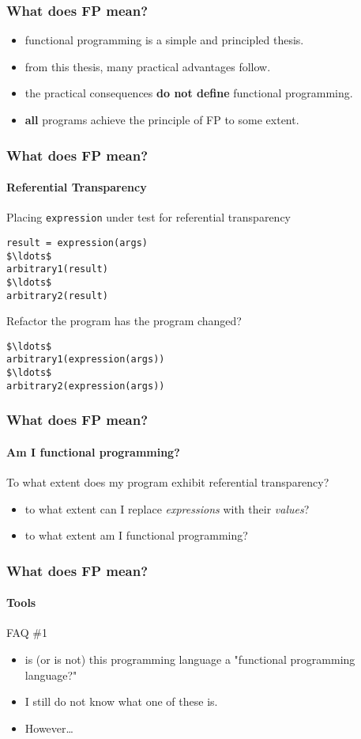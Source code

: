 \begin{frame}
\frametitle{What does FP mean?}
\begin{itemize}
  \item<1-> functional programming is a simple and principled thesis.
  \item<1-> from this thesis, many practical advantages follow.
  \item<2-> the practical consequences \textbf{do not define} functional programming.
  \item<3-> \textbf{all} programs achieve the principle of FP to some extent.
\end{itemize}
\end{frame}

\begin{frame}[fragile]
\frametitle{What does FP mean?}
\framesubtitle{Referential Transparency}
\begin{block}{Placing \lstinline{expression} under test for referential transparency}
\scriptsize
\begin{lstlisting}[mathescape]
result = expression(args)
$\ldots$
arbitrary1(result)
$\ldots$
arbitrary2(result)
\end{lstlisting}
\end{block}
\begin{block}{Refactor the program \textemdash has the program changed?}
\scriptsize
\begin{lstlisting}[mathescape]
$\ldots$
arbitrary1(expression(args))
$\ldots$
arbitrary2(expression(args))
\end{lstlisting}
\end{block}
\end{frame}

\begin{frame}[fragile]
\frametitle{What does FP mean?}
\framesubtitle{Am I functional programming?}
\begin{block}{To what extent does my program exhibit referential transparency?}
\begin{itemize}
  \item<1-> to what extent can I replace \emph{expressions} with their \emph{values}?
  \item<2-> to what extent am I functional programming?
\end{itemize}
\end{block}
\end{frame}

\begin{frame}[fragile]
\frametitle{What does FP mean?}
\framesubtitle{Tools}
\begin{block}{FAQ \#1}
\begin{itemize}
  \item<1-> is (or is not) this programming language a "functional programming language?"
  \item<2-> I still do not know what one of these is.
  \item<3-> However\ldots
\end{itemize}
\end{block}
\end{frame}

